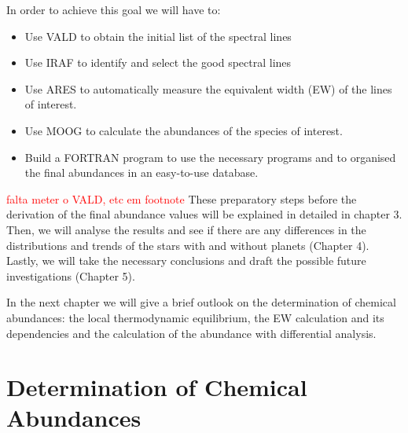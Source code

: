 \documentclass[dvips,12pt,a4paper]{report}
\begin{document}
{In order to achieve this goal we will have to:

\begin{itemize}
\item Use VALD to obtain the initial list of the spectral lines
\item Use IRAF to identify and select the good spectral lines
\item Use ARES to automatically measure the equivalent width (EW) of the lines of interest.
\item Use MOOG to calculate the abundances of the species of interest.
\item Build a FORTRAN program to use the necessary programs and to organised the final abundances in an easy-to-use database.
\end{itemize}
\textcolor{red}{falta meter o VALD, etc em footnote}
These preparatory steps before the derivation of the final abundance values will be explained in detailed in chapter 3. Then, we will analyse the results and see if there are any differences in the distributions and trends of the stars with and without planets (Chapter 4). Lastly, we will take the necessary conclusions and draft the possible future investigations (Chapter 5).

In the next chapter we will give a brief outlook on the determination of chemical abundances: the local thermodynamic equilibrium, the EW calculation and its dependencies and the calculation of the abundance with differential analysis.





\chapter{Determination of Chemical Abundances}

}
\end{document}
